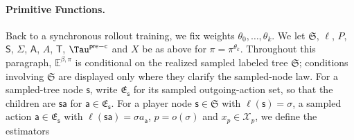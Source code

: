 \documentclass[12pt, a4paper]{article}
\begin{document}
\paragraph{Primitive Functions.}
Back to a synchronous rollout training, we fix weights $\theta_0,\ldots, \theta_k$.
We let $\mathfrak{S}$, $\ell$, $P$, $\mathsf{S}$, $\Sigma$, $\mathsf{A}$, $A$, $\mathsf{T}$, $\Tau^{\mathsf{pre-c}}$ and $X$ be as above for $\pi = \pi^{\theta_k}$.
Throughout this paragraph, $\mathbb E^{\beta,\pi}$ is conditional on the realized sampled labeled tree $\mathfrak S$; conditions involving $\mathfrak S$ are displayed only where they clarify the sampled-node law.
For a sampled-tree node $\mathsf{s}$, write $\mathfrak{E}_{\mathsf{s}}$ for its sampled outgoing-action set, so that the children are $\mathsf{s}\mathsf{a}$ for $\mathsf{a}\in\mathfrak{E}_{\mathsf{s}}$.
For a player node $\mathsf{s}\in \mathfrak{S}$ with $\ell(\mathsf{s})=\sigma$, a sampled action $\mathsf{a}\in\mathfrak{E}_{\mathsf{s}}$ with $\ell(\mathsf{s}\mathsf{a})=\sigma a_{\mathsf{a}}$, $p=o(\sigma)$ and $x_p\in\mathcal X_p$, we define the estimators
\end{document}
